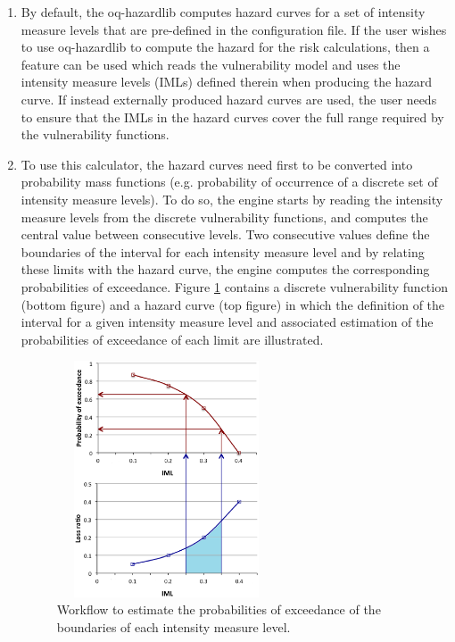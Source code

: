 \begin{enumerate}

\item By default, the oq-hazardlib computes hazard curves for a set of intensity measure levels that are pre-defined in the configuration file. If the user wishes to use oq-hazardlib to compute the hazard for the risk calculations, then a feature can be used which reads the \gls{vulnerability model} and uses the intensity measure levels (IMLs) defined therein when producing the hazard curve. If instead externally produced hazard curves are used, the user needs to ensure that the IMLs in the hazard curves cover the full range required by the \glspl{vulnerability function}. 

\item To use this calculator, the hazard curves need first to be converted into probability mass functions (e.g. probability of occurrence of a discrete set of intensity measure levels). To do so, the engine starts by reading the intensity measure levels from the discrete \glspl{vulnerability function}, and computes the central value between consecutive levels. Two consecutive values define the boundaries of the interval for each intensity measure level and by relating these limits with the hazard curve, the engine computes the corresponding probabilities of exceedance. Figure \ref{fig:ProbOccurrence} contains a discrete \gls{vulnerability function} (bottom figure) and a hazard curve (top figure) in which the definition of the interval for a given intensity measure level and associated estimation of the probabilities of exceedance of each limit are illustrated. 

\begin{figure}[ht]
\centering
\includegraphics[width=6.5cm,height=7cm]{./figures/risk/ProbOccurrence.eps}
\caption{Workflow to estimate the probabilities of exceedance of the boundaries of each intensity measure level.}
\label{fig:ProbOccurrence}
\end{figure}


\end{enumerate}
